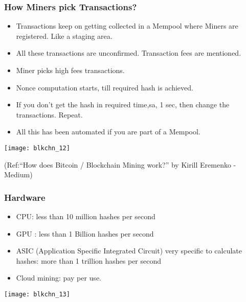 \begin{frame}[fragile]\frametitle{How Miners pick Transactions?}
\begin{itemize}
\item Transactions keep on getting collected in a Mempool where Miners are registered. Like a staging area.
\item All these transactions are unconfirmed. Transaction fees are mentioned.
\item Miner picks high fees transactions.
\item Nonce computation starts, till required hash is achieved.
\item If you don't get the hash in required time,sa, 1 sec, then change the transactions. Repeat.
\item All this has been automated if you are part of a Mempool.
\end{itemize}

\begin{center}
\texttt{[image: blkchn\_12]}

{\tiny (Ref:``How does Bitcoin / Blockchain Mining work?'' by Kirill Eremenko  - Medium)}
\end{center}
\end{frame}

\begin{frame}[fragile]\frametitle{Hardware}
\begin{itemize}
\item CPU: less than 10 million hashes per second
\item GPU : less than 1 Billion hashes per second
\item ASIC (Application Specific Integrated Circuit) very specific to calculate hashes: more than 1 trillion hashes per second
\item Cloud mining: pay per use.
\end{itemize}

\begin{center}
\texttt{[image: blkchn\_13]}
\end{center}
\end{frame}

